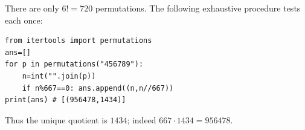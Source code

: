 There are only $6!=720$ permutations. The following exhaustive procedure tests each once:\begin{verbatim}
from itertools import permutations
ans=[]
for p in permutations("456789"):
    n=int("".join(p))
    if n%667==0: ans.append((n,n//667))
print(ans) # [(956478,1434)]
\end{verbatim}
Thus the unique quotient is $\boxed{1434}$; indeed $667\cdot1434=956478$.
